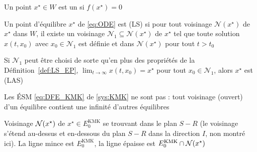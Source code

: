 \documentclass[aspectratio=169]{beamer}\usepackage[]{graphicx}\usepackage[]{xcolor}
\begin{document}
\begin{frame}
Un point $x^\star\in W$ est un  si $f(x^\star)=0$
\vfill
\begin{definition}\label{def:LS_EP}
Un point d'équilibre $x^\star$ de \eqref{eq:ODE} est  (LS) si pour tout voisinage $\mathcal{N}(x^\star)$ de $x^\star$ dans $W$, il existe un voisinage $\mathcal{N}_1\subseteq\mathcal{N}(x^\star)$ de $x^\star$ tel que toute solution $x(t,x_0)$ avec $x_0\in\mathcal{N}_1$ est définie et dans $\mathcal{N}(x^\star)$ pour tout $t>t_0$
\end{definition}
\vfill
\begin{definition}
Si $\mathcal{N}_1$ peut être choisi de sorte qu'en plus des propriétés de la Définition~\ref{def:LS_EP}, $\lim_{t\to\infty}x(t,x_0)=x^\star$ pour tout $x_0\in\mathcal{N}_1$, alors $x^\star$ est  (LAS)
\end{definition}
\end{frame}

\begin{frame}
Les ÉSM \eqref{eq:DFE_KMK} de \eqref{sys:KMK} ne sont pas  : tout voisinage (ouvert) d'un équilibre contient une infinité d'autres équilibres
\vfill
\begin{center}
\end{center}
\vfill
Voisinage $\mathcal{N}(x^\star)$ de $x^\star\in E_0^\text{KMK}$ se trouvant dans le plan $S-R$ (le voisinage s'étend au-dessus et en-dessous du plan $S-R$ dans la direction $I$, non montré ici). 
La ligne mince est $E_0^\text{KMK}$, la ligne épaisse est $E_0^\text{KMK}\cap\mathcal{N}(x^\star)$
\end{frame}
\end{document}
